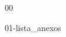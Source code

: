 \documentclass[a4paper, oneside, 11pt,]{report} %
\begin{document}



{00}



{01-lista_anexos}
\end{document}
